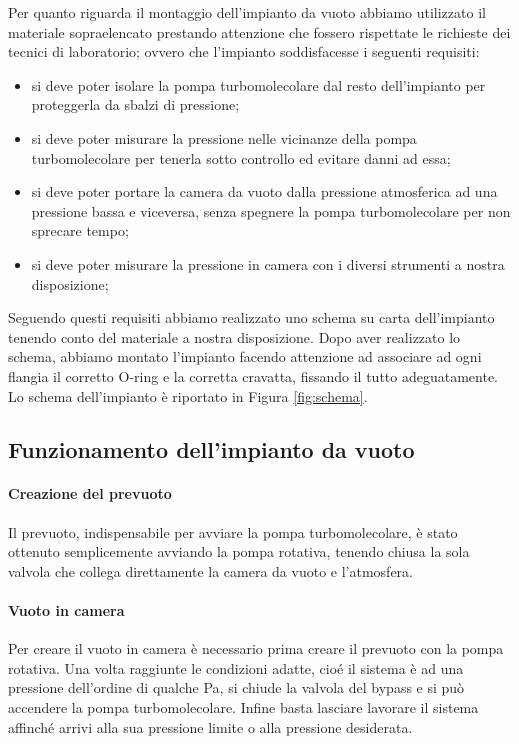 Per quanto riguarda il montaggio dell'impianto da vuoto abbiamo utilizzato il materiale sopraelencato
prestando attenzione che fossero rispettate le richieste dei tecnici di laboratorio;
ovvero che l'impianto soddisfacesse i seguenti requisiti:
\begin{itemize}
	\item{si deve poter isolare la pompa turbomolecolare dal resto dell'impianto per proteggerla da sbalzi di pressione;}
	\item{si deve poter misurare la pressione nelle vicinanze della pompa turbomolecolare per tenerla sotto controllo ed evitare danni ad essa;}	
	\item{si deve poter portare la camera da vuoto dalla pressione atmosferica ad una pressione bassa e viceversa, senza spegnere la pompa turbomolecolare per non sprecare tempo;}
	\item{si deve poter misurare la pressione in camera con i diversi strumenti a nostra disposizione;}
\end{itemize}

Seguendo questi requisiti abbiamo realizzato uno schema su carta dell'impianto tenendo conto del materiale a nostra disposizione. Dopo aver realizzato lo schema, abbiamo montato l'impianto facendo attenzione ad associare ad ogni flangia il corretto O-ring e la corretta cravatta, fissando il tutto adeguatamente. Lo schema dell'impianto è riportato in Figura \ref{fig:schema}.

\subsection{Funzionamento dell'impianto da vuoto}
\paragraph{Creazione del prevuoto\\}
Il prevuoto, indispensabile per avviare la pompa turbomolecolare, è stato ottenuto semplicemente avviando la pompa rotativa, tenendo chiusa la sola valvola che collega direttamente la camera da vuoto e l'atmosfera.
\paragraph{Vuoto in camera\\}
Per creare il vuoto in camera è necessario prima creare il prevuoto con la pompa rotativa. Una volta raggiunte le condizioni adatte, cioé il sistema è ad una pressione dell'ordine di qualche \si{\Pa}, si chiude la valvola del bypass e si può accendere la pompa turbomolecolare. Infine basta lasciare lavorare il sistema affinché arrivi alla sua pressione limite o alla pressione desiderata.
